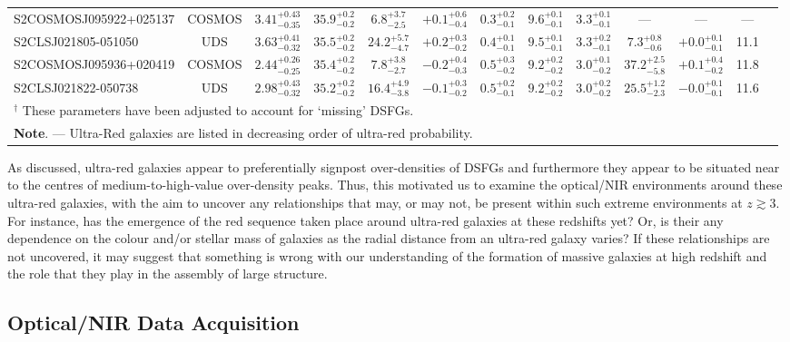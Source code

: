 \documentclass[a4paper, fleqn, usenatbib]{mnras}
\newcommand{\urg}{ultra-red galaxy}
\newcommand{\urgs}{ultra-red galaxies}
\begin{document}
\begin{landscape}
\begin{table}
\begin{tabular}{l c c c c c c c c c c c c}
        S2COSMOSJ095922+025137 & COSMOS & $3.41^{+0.43}_{-0.35}$ & $35.9^{+0.2}_{-0.2}$ & $6.8^{+3.7}_{-2.5}$ & $+0.1^{+0.6}_{-0.4}$ & $0.3^{+0.2}_{-0.1}$ & $9.6^{+0.1}_{-0.1}$ & $3.3^{+0.1}_{-0.1}$ & --- & --- & ---\\
        S2CLSJ021805-051050 & UDS & $3.63^{+0.41}_{-0.32}$ & $35.5^{+0.2}_{-0.2}$ & $24.2^{+5.7}_{-4.7}$ & $+0.2^{+0.3}_{-0.2}$ & $0.4^{+0.1}_{-0.1}$ & $9.5^{+0.1}_{-0.1}$ & $3.3^{+0.2}_{-0.1}$ & $7.3^{+0.8}_{-0.6}$ & $+0.0^{+0.1}_{-0.1}$ & 11.1\\
        S2COSMOSJ095936+020419 & COSMOS & $2.44^{+0.26}_{-0.25}$ & $35.4^{+0.2}_{-0.2}$ & $7.8^{+3.8}_{-2.7}$ & $-0.2^{+0.4}_{-0.3}$ & $0.5^{+0.3}_{-0.2}$ & $9.2^{+0.2}_{-0.2}$ & $3.0^{+0.1}_{-0.2}$ & $37.2^{+2.5}_{-5.8}$ & $+0.1^{+0.4}_{-0.2}$ & 11.8\\
        S2CLSJ021822-050738 & UDS & $2.98^{+0.43}_{-0.32}$ & $35.2^{+0.2}_{-0.2}$ & $16.4^{+4.9}_{-3.8}$ & $-0.1^{+0.3}_{-0.2}$ & $0.5^{+0.2}_{-0.1}$ & $9.2^{+0.2}_{-0.2}$ & $3.0^{+0.2}_{-0.2}$ & $25.5^{+1.2}_{-2.3}$ & $-0.0^{+0.1}_{-0.1}$ & 11.6\\
        \hline
        \multicolumn{11}{l}{$^{\dagger}$ These parameters have been adjusted to account for `missing' DSFGs.}\\
        \multicolumn{11}{l}{\textbf{Note}. --- Ultra-Red galaxies are listed in decreasing order of ultra-red probability.}\\
    \end{tabular}
\end{table}
\end{landscape}

As discussed, \urgs{} appear to preferentially signpost over-densities of DSFGs and furthermore they appear to be situated near to the centres of medium-to-high-value over-density peaks.
Thus, this motivated us to examine the optical/NIR environments around these \urgs{}, with the aim to uncover any relationships that may, or may not, be present within such extreme environments at $z\gtrsim3$.
For instance, has the emergence of the red sequence taken place around \urgs{} at these redshifts yet?
Or, is their any dependence on the colour and/or stellar mass of galaxies as the radial distance from an \urg{} varies?
If these relationships are not uncovered, it may suggest that something is wrong with our understanding of the formation of massive galaxies at high redshift and the role that they play in the assembly of large structure.

\subsection{Optical/NIR Data Acquisition}
\end{document}
